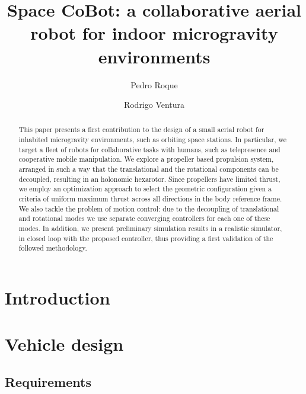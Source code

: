 \documentclass[11pt,a4paper]{article}
\begin{document}
\title{Space CoBot: a collaborative aerial robot for indoor microgravity
  environments}
\author{Pedro Roque}
\author{Rodrigo Ventura}
\date{}
\maketitle

\begin{abstract}
  This paper presents a first contribution to the design of a small
  aerial robot for inhabited microgravity environments, such as
  orbiting space stations. In particular, we target a fleet of robots
  for collaborative tasks with humans, such as telepresence and
  cooperative mobile manipulation. We explore a propeller based
  propulsion system, arranged in such a way that the translational and
  the rotational components can be decoupled, resulting in an holonomic
  hexarotor. Since propellers have limited thrust, we employ an
  optimization approach to select the geometric configuration
  given a criteria of uniform maximum thrust across all directions in
  the body reference frame. We also tackle the problem of motion
  control: due to the decoupling of translational and rotational modes
  we use separate converging controllers for each one of these
  modes. In addition, we present preliminary simulation results in a
  realistic simulator, in closed loop with the proposed controller,
  thus providing a first validation of the followed methodology.
\end{abstract}

\section{Introduction}
\label{sec:introduction}


\section{Vehicle design}
\label{sec:vehicle-design}

\subsection{Requirements}
\label{sec:requirements}

\end{document}
